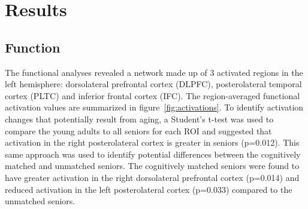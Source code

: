 \section{Results}

\subsection{Function}
The functional analyses revealed a network made up of 3 activated regions in the left hemisphere: dorsolateral prefrontal cortex (DLPFC), posterolateral temporal cortex (PLTC) and inferior frontal cortex (IFC). The region-averaged functional activation values are summarized in figure~\ref{fig:activations}. To identify activation changes that potentially result from aging, a Student's t-test was used to compare the young adults to all seniors for each ROI and suggested that activation in the right posterolateral cortex is greater in seniors (p=0.012). This same approach was used to identify potential differences between the cognitively matched and unmatched seniors. The cognitively matched seniors were found to have greater activation in the right dorsolateral prefrontal cortex (p=0.014) and reduced activation in the left posterolateral cortex (p=0.033) compared to the unmatched seniors.

